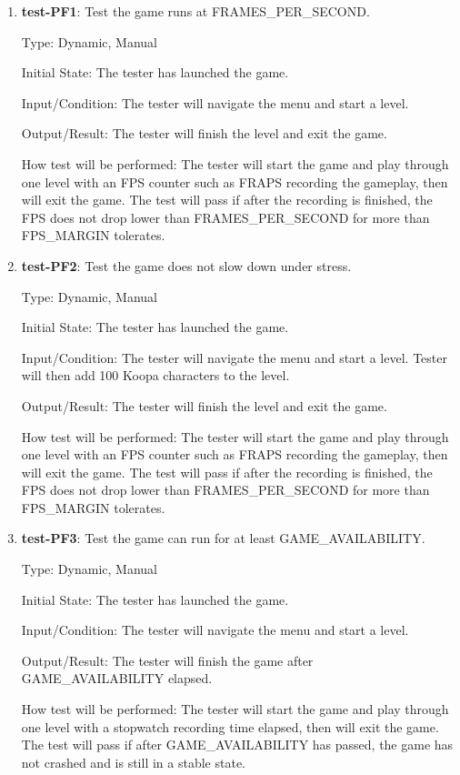 \documentclass[12pt, titlepage]{article}
\begin{document}
\begin{enumerate}

\item{\textbf{test-PF1}: Test the game runs at FRAMES\_PER\_SECOND.\\}

Type: Dynamic, Manual
					
Initial State: The tester has launched the game.
					
Input/Condition: The tester will navigate the menu and start a level.
					
Output/Result: The tester will finish the level and exit the game.
					
How test will be performed: The tester will start the game and play through one level with an FPS counter such as FRAPS recording the gameplay, then will exit the game. The test will pass if after the recording is finished, the FPS does not drop lower than FRAMES\_PER\_SECOND for more than FPS\_MARGIN tolerates.

\item{\textbf{test-PF2}: Test the game does not slow down under stress.\\}

Type: Dynamic, Manual
					
Initial State: The tester has launched the game.
					
Input/Condition: The tester will navigate the menu and start a level. Tester will then add 100 Koopa characters to the level.
					
Output/Result: The tester will finish the level and exit the game.
					
How test will be performed: The tester will start the game and play through one level with an FPS counter such as FRAPS recording the gameplay, then will exit the game. The test will pass if after the recording is finished, the FPS does not drop lower than FRAMES\_PER\_SECOND for more than FPS\_MARGIN tolerates.


\item{\textbf{test-PF3}: Test the game can run for at least GAME\_AVAILABILITY.\\}

Type: Dynamic, Manual
					
Initial State: The tester has launched the game.
					
Input/Condition: The tester will navigate the menu and start a level.
					
Output/Result: The tester will finish the game after GAME\_AVAILABILITY elapsed.
					
How test will be performed: The tester will start the game and play through one level with a stopwatch recording time elapsed, then will exit the game. The test will pass if after GAME\_AVAILABILITY has passed, the game has not crashed and is still in a stable state.
\end{enumerate}
\end{document}
